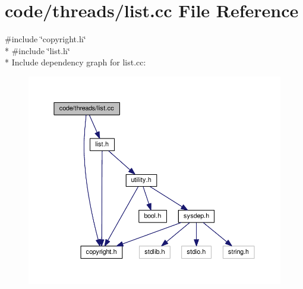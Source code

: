 \section{code/threads/list.cc File Reference}
\label{list_8cc}
{\ttfamily \#include \char`\"{}copyright.\+h\char`\"{}}\\*
{\ttfamily \#include \char`\"{}list.\+h\char`\"{}}\\*
Include dependency graph for list.\+cc\+:
\nopagebreak
\begin{figure}[H]
\begin{center}
\leavevmode
\includegraphics[width=350pt]{list_8cc__incl}
\end{center}
\end{figure}
